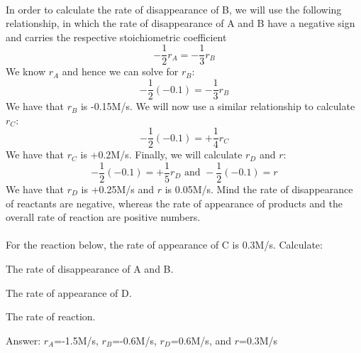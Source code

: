 \documentclass[main.tex]{subfiles}
\begin{document}
\begin{description}
\begin{example}
\begin{inparaenum}[(a)]
\end{inparaenum} 
\begin{center}\end{center}
\\
In order to calculate the rate of disappearance of B, we will use the following relationship, in which the rate of disappearance of A and B have a negative sign and carries the respective stoichiometric coefficient
\[-\frac{1}{2}r_A=-\frac{1}{3}r_B\]
We know $r_A$ and hence we can solve for $r_B$:
\[-\frac{1}{2}(-0.1)=-\frac{1}{3}r_B\]
We have that $r_B$ is -0.15M/s. We will now use a similar relationship to calculate $r_C$:
\[-\frac{1}{2}(-0.1)=+\frac{1}{4}r_C\]
We have that $r_C$ is +0.2M/s. Finally, we will calculate $r_D$ and $r$:
\[-\frac{1}{2}(-0.1)=+\frac{1}{5}r_D \text{ and } -\frac{1}{2}(-0.1)=r\]
We have that $r_D$ is +0.25M/s and $r$ is 0.05M/s. Mind the rate of disappearance of reactants are negative, whereas the rate of appearance of products and the overall rate of reaction are positive numbers.
\\\faDiamond\ \\
For the reaction below, the rate of appearance of C is 0.3M/s. Calculate:
\begin{inparaenum}[(a)]	
\item The rate of disappearance of A and B.
\item  The rate of appearance of D.
\item  The rate of reaction.
\end{inparaenum} 
\begin{center}\end{center}
\flushright Answer:  $r_A$=-1.5M/s, $r_B$=-0.6M/s, $r_D$=0.6M/s, and $r$=0.3M/s
\end{example}%
\end{description}
\end{document}
